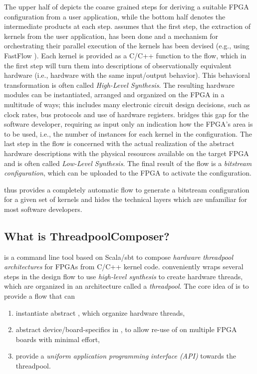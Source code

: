 \medskip
The upper half of  depicts the coarse grained steps for deriving a suitable FPGA configuration from a user application, while the bottom half denotes the intermediate products at each step.
\tpc{} assumes that the first step, the extraction of kernels from the user application, has been done and a mechanism for orchestrating their parallel execution of the kernels has been devised (e.g., using FastFlow \cite{fastflow}).
Each kernel is provided as a C/C++ function to the \tpc{} flow, which in the first step will turn them into descriptions of observationally equivalent hardware (i.e., hardware with the same input/output behavior).
This behavioral transformation is often called \emph{High-Level Synthesis}.
The resulting hardware modules can be instantiated, arranged and organized on the FPGA in a multitude of ways; this includes many electronic circuit design decisions, such as clock rates, bus protocols and use of hardware registers.
\tpc{} bridges this gap for the software developer, requiring as input only an indication how the FPGA's area is to be used, i.e., the number of instances for each kernel in the configuration.
The last step in the flow is concerned with the actual realization of the abstract hardware descriptions with the physical resources available on the target FPGA and is often called \emph{Low-Level Synthesis}.
The final result of the \tpc{} flow is a \emph{bitstream configuration}, which can be uploaded to the FPGA to activate the configuration.

\medskip
\tpc{} thus provides a completely automatic flow to generate a bitstream configuration for a given set of kernels and hides the technical layers which are unfamiliar for most software developers.

\subsection*{What is ThreadpoolComposer?}
\tpc{} is a command line tool based on Scala/sbt to compose \emph{hardware threadpool architectures} for FPGAs from C/C++ kernel code.
\tpc{} conveniently wraps several steps in the design flow to use \emph{high-level synthesis} to create hardware threads, which are organized in an architecture called a \emph{threadpool}.
The core idea of \tpc{} is to provide a flow that can
\begin{enumerate}
  \item instantiate abstract , which organize hardware threads,
  \item abstract device/board-specifics in , to allow re-use of  on multiple FPGA boards with minimal effort,
  \item provide a \emph{uniform application programming interface (API)} towards the threadpool.
\end{enumerate}

